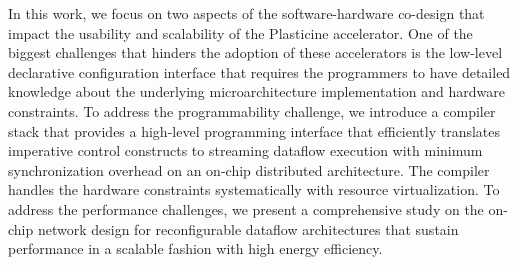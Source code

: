 In this work, we focus on two aspects of the software-hardware co-design that impact the usability
and scalability of the Plasticine accelerator. 
One of the biggest challenges that hinders the adoption of these
accelerators is the low-level declarative configuration interface that requires the programmers to
have detailed knowledge about the underlying microarchitecture implementation and hardware
constraints. To address the programmability challenge, we introduce a compiler stack that provides a high-level
programming interface that efficiently translates imperative control constructs to streaming
dataflow execution with minimum synchronization overhead on an on-chip distributed architecture. The
compiler handles the hardware constraints systematically with resource virtualization. To address
the performance challenges, we present a comprehensive study on the on-chip network design for 
reconfigurable dataflow architectures that sustain performance in a scalable fashion with high energy efficiency.
